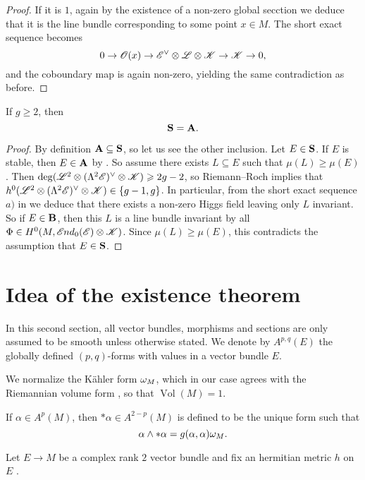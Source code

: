 \documentclass[A4paper, 12pt, british, reqno]{amsart}
\newcommand{\ot}{\otimes}
\newcommand{\dual}{^{\vee}}
\begin{document}
\begin{lm}
\begin{proof}
	If it is $1$, again by the existence of a non-zero global secction we deduce that it is the line bundle corresponding to some point $x\in M$.
	The short exact sequence becomes
	\[ 0\to \O(x)\to \E\dual\ot\L\ot\sK\to \sK\to 0, \]
	and the coboundary map is again non-zero, yielding the same contradiction as before.
    \end{proof}
\end{lm}

\begin{lm}
    If $g\geqslant 2$, then
    \[ \mathbf{S}=\mathbf{A}. \]
    \begin{proof}
	By definition $\mathbf{A}\subseteq \mathbf{S}$, so let us see the other inclusion.
	Let $E\in \mathbf{S}$.
	If $E$ is stable, then $E\in \mathbf{A}$ by .
	So assume there exists $L\subseteq E$ such that $\mu(L)\geqslant \mu(E)$.
	Then $\deg(\L^{2}\ot(\Lambda^{2}\E)\dual\ot\sK)\geqslant 2g-2$, so Riemann--Roch implies that $h^{0}(\L^{2}\ot(\Lambda^{2}\E)\dual\ot\sK)\in \{g-1,g\}$.
	In particular, from the short exact sequence $a)$ in  we deduce that there exists a non-zero Higgs field leaving only $L$ invariant.
	So if $E\in \mathbf{B}$, then this $L$ is a line bundle invariant by all $\Phi\in H^{0}(M,\sEnd_{0}(\E)\ot \sK)$.
	Since $\mu(L)\geqslant \mu(E)$, this contradicts the assumption that $E\in \mathbf{S}$.
    \end{proof}
\end{lm}

\section{Idea of the existence theorem}

\begin{unota}
    In this second section, all vector bundles, morphisms and sections are only assumed to be smooth unless otherwise stated.
    We denote by $A^{p,q}(E)$ the globally defined $(p,q)$-forms with values in a vector bundle $E$.

    We normalize the Kähler form $\omega_{M}$, which in our case agrees with the Riemannian volume form \cite[Lemma 3.8]{voi02}, so that $\operatorname{Vol}(M)=1$.

    If $\alpha\in A^{p}(M)$, then $*\alpha\in A^{2-p}(M)$ is defined to be the unique form such that
    \[ \alpha\wedge *\alpha=g(\alpha,\alpha)\omega_{M}. \]
\end{unota}

Let $E\to M$ be a complex rank $2$ vector bundle and fix an hermitian metric $h$ on $E$ \cite[Proposition 4.1.4]{huy05}.
\end{document}
